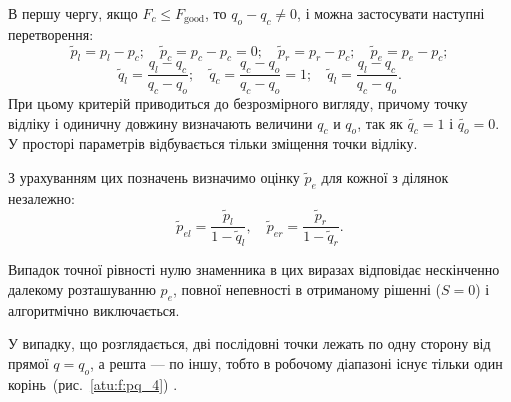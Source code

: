 \documentclass[a4paper,13pt]{atuaref}
\begin{document}
В першу чергу, якщо
$F_c \le F_\mathrm{good}$, то $q_o -q_c \ne 0$,
і можна застосувати наступні перетворення:
%
\[
  \tilde{p}_l = p_l - p_c;
  \quad
  \tilde{p}_c = p_c - p_c = 0;
  \quad
  \tilde{p}_r = p_r - p_c;
  \quad
  \tilde{p}_e = p_e - p_c;
\]
\begin{equation}
  \tilde{q}_l = \frac{q_l-q_c}{q_c-q_o};
  \quad
  \tilde{q}_c = \frac{q_c-q_o}{q_c-q_o} = 1;
  \quad
  \tilde{q}_l = \frac{q_l-q_c}{q_c-q_o}.
  \label{atu:eq:q_agent_rel}
\end{equation}
%
При цьому критерій приводиться до безрозмірного вигляду, причому точку відліку і одиничну довжину визначають величини
$q_c$ и $q_o$, так як $\tilde{q_c} = 1$ і $\tilde{q_o} = 0$.
У просторі параметрів відбувається тільки зміщення точки відліку.

З урахуванням цих позначень визначимо оцінку
$\tilde{p}_e$
для кожної з ділянок незалежно:
%
\begin{equation}
  \tilde{p}_{el} = \frac{\tilde{p}_l}{1-\tilde{q}_l},
  \quad
  \tilde{p}_{er} = \frac{\tilde{p}_r}{1-\tilde{q}_r}.
  \label{atu:eq:pr_ex}
\end{equation}

Випадок точної рівності нулю знаменника в цих виразах відповідає нескінченно
далекому розташуванню $ p_e $, повної непевності в отриманому рішенні ($S = 0$)
і алгоритмічно виключається.

У випадку, що розглядається, дві послідовні точки лежать по одну сторону від прямої
$ q = q_o $, а решта --- по іншу, тобто в робочому діапазоні існує тільки один
корінь~(рис.~\ref{atu:f:pq_4}) .
\end{document}
